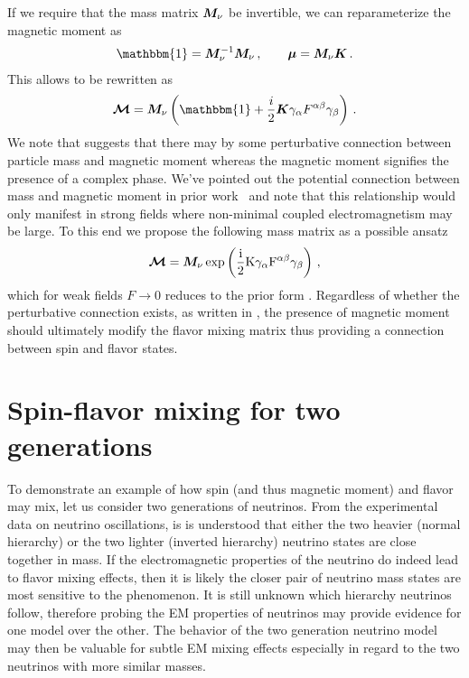 If we require that the mass matrix $\boldsymbol{M}_{\nu}$ be invertible, we can reparameterize the magnetic moment as 
\begin{align}
	\label{invert:1}
    \mathbbm{1} = \bb{M}_{\nu}^{-1}\bb{M}_{\nu}\,,\qquad
    \bb{\mu} = \bb{M}_{\nu}\bb{K}\,.
\end{align}
This allows  to be rewritten as
\begin{alignat}{1}
	\label{invert:2} {\bb{\mathcal{M}}} = \bb{M}_{\nu}\left(\mathbbm{1} + \frac{i}{2}\bb{K}\gamma_{\alpha}F^{\alpha\beta}\gamma_{\beta}\right)\,.
\end{alignat}
We note that  suggests that there may by some perturbative connection between particle mass and magnetic moment whereas the magnetic moment signifies the presence of a complex phase. We've pointed out the potential connection between mass and magnetic moment in prior work~\citep{Steinmetz:2018ryf} and note that this relationship would only manifest in strong fields where non-minimal coupled electromagnetism may be large. To this end we propose the following mass matrix as a possible ansatz
\begin{alignat}{1}
	\label{mass:eq:10} {\boldsymbol{\mathcal{M}}} = \boldsymbol{M}_{\nu}\,\rm{exp}\left(\frac{i}{2}\boldsymbol{K}\gamma_{\alpha}F^{\alpha\beta}\gamma_{\beta}\right)\,,
\end{alignat}
which for weak fields $F\rightarrow0$ reduces to the prior form . Regardless of whether the perturbative connection exists, as written in , the presence of magnetic moment should ultimately modify the flavor mixing matrix thus providing a connection between spin and flavor states.

\section{Spin-flavor mixing for two generations}
\label{sec:mix}
\noindent To demonstrate an example of how spin (and thus magnetic moment) and flavor may mix, let us consider two generations of neutrinos. From the experimental data on neutrino oscillations, is is understood that either the two heavier (normal hierarchy) or the two lighter (inverted hierarchy) neutrino states are close together in mass. If the electromagnetic properties of the neutrino do indeed lead to flavor mixing effects, then it is likely the closer pair of neutrino mass states are most sensitive to the phenomenon. It is still unknown which hierarchy neutrinos follow, therefore probing the EM properties of neutrinos may provide evidence for one model over the other. The behavior of the two generation neutrino model may then be valuable for subtle EM mixing effects especially in regard to the two neutrinos with more similar masses.

